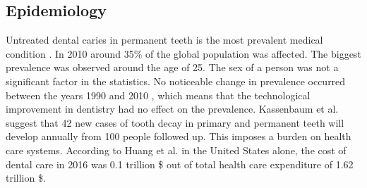 \subsection{Epidemiology}
Untreated dental caries in permanent teeth is the most prevalent medical condition \cite{Kassebaum2015}. In 2010 around 35\% of the global population was affected. The biggest prevalence was observed around the age of 25. The sex of a person was not a significant factor in the statistics. No noticeable change in prevalence occurred between the years 1990 and 2010 \cite{Kassebaum2015} \cite{Frencken2017}, which means that the technological improvement in dentistry had no effect on the prevalence.
Kassenbaum et al. suggest that 42 new cases of tooth decay in primary and permanent teeth will develop annually from 100 people followed up. This imposes a burden on health care systems. According to Huang et al. \cite{Hung2020} in the United States alone, the cost of dental care in 2016 was 0.1 trillion \$ out of total health care expenditure of 1.62 trillion \$.
